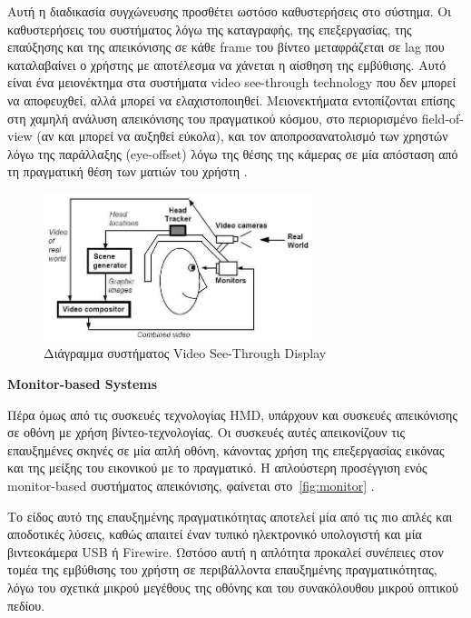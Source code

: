 Αυτή η διαδικασία συγχώνευσης προσθέτει ωστόσο καθυστερήσεις στο σύστημα. Οι καθυστερήσεις του συστήματος λόγω της καταγραφής, της επεξεργασίας, της επαύξησης και της απεικόνισης σε κάθε frame του βίντεο μεταφράζεται σε lag που καταλαβαίνει ο χρήστης με αποτέλεσμα να χάνεται η αίσθηση της εμβύθισης. Αυτό είναι ένα μειονέκτημα στα συστήματα video see-through technology που δεν μπορεί να αποφευχθεί, αλλά μπορεί να ελαχιστοποιηθεί. Μειονεκτήματα εντοπίζονται επίσης στη χαμηλή ανάλυση απεικόνισης του πραγματικού κόσμου, στο περιορισμένο field-of-view (αν και μπορεί να αυξηθεί εύκολα), και τον αποπροσανατολισμό των χρηστών λόγω της παράλλαξης (eye-offset) λόγω της θέσης της κάμερας σε μία απόσταση από τη πραγματική θέση των ματιών του χρήστη \cite{Malik2002} . 



\begin{figure}[H]
    \centering
    \includegraphics[width=0.7\textwidth]{Files/Figures/videoseethrough.jpg}
    \caption[Διάγραμμα συστήματος Video See-Through Display]{ Διάγραμμα συστήματος Video See-Through Display \cite{azuma1997}}
    \label{fig:videoseethrough}
\end{figure}


\textbf{Monitor-based Systems}


Πέρα όμως από τις συσκευές τεχνολογίας HMD, υπάρχουν και συσκευές απεικόνισης σε οθόνη με χρήση βίντεο-τεχνολογίας. Οι συσκευές αυτές απεικονίζουν τις επαυξημένες σκηνές σε μία απλή οθόνη, κάνοντας χρήση της επεξεργασίας εικόνας και της μείξης του εικονικού με το πραγματικό. Η απλούστερη προσέγγιση ενός monitor-based συστήματος απεικόνισης, φαίνεται στο~\ref{fig:monitor} .


Το είδος αυτό της επαυξημένης πραγματικότητας αποτελεί μία από τις πιο απλές και αποδοτικές λύσεις, καθώς απαιτεί έναν τυπικό ηλεκτρονικό υπολογιστή και μία βιντεοκάμερα USB ή Firewire. Ωστόσο αυτή η απλότητα προκαλεί συνέπειες στον τομέα της εμβύθισης του χρήστη σε περιβάλλοντα επαυξημένης πραγματικότητας, λόγω του σχετικά μικρού μεγέθους της οθόνης και του συνακόλουθου μικρού οπτικού πεδίου.


